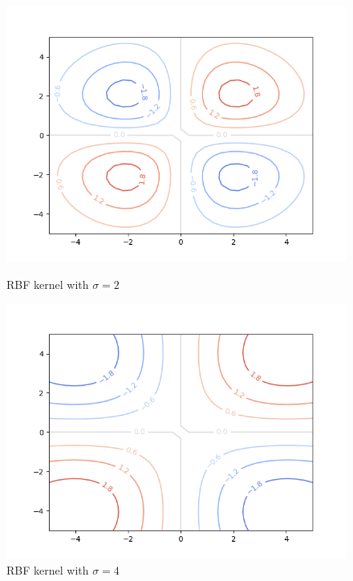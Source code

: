\documentclass[12pt]{article}
\begin{document}
\begin{figure}[!htb]
\begin{minipage}{0.48\textwidth}
    \end{minipage}\hfill
    \begin{minipage}{0.48\textwidth}
        \centering
        \includegraphics[width=\linewidth]{Figure_3.png}
        \caption{RBF kernel with $\sigma=2$}
    \end{minipage}\hfill
    \begin{minipage}{0.48\textwidth}
        \centering
        \includegraphics[width=\linewidth]{Figure_4.png}
        \caption{RBF kernel with $\sigma=4$}
    \end{minipage}
\end{figure}
\end{document}
